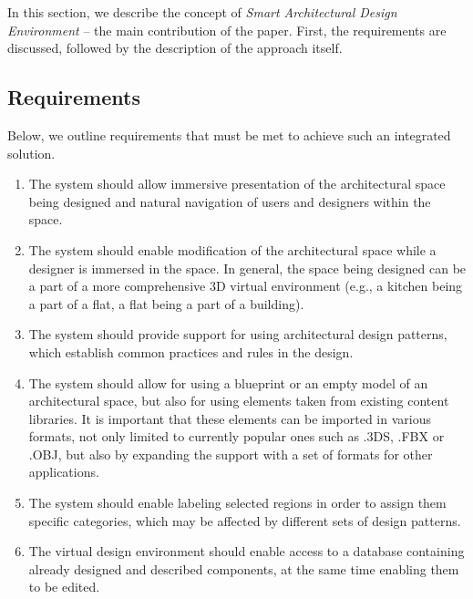 \documentclass[runningheads]{llncs}
\begin{document}
In this section, we describe the concept of \textit{Smart Architectural Design Environment} -- the main contribution of the paper. First, the requirements are discussed, followed by the description of the approach itself.  

\subsection{Requirements}
Below, we outline requirements that must be met to achieve such an integrated solution.

\begin{enumerate}
\item	\label{req-vr} The system should allow immersive presentation of the architectural space being designed and natural navigation of users and designers within the space.\\

\item	\label{req-edit-vr} The system should enable modification of the architectural space while a designer is immersed in the space. In general, the space being designed can be a part of a more comprehensive 3D virtual environment (e.g., a kitchen being a part of a flat, a flat being a part of a building).\\

\item \label{req-patterns} The system should provide support for using architectural design patterns, which establish common practices and rules in the design. \\

\item \label{req-libraries} The system should allow for using a blueprint or an empty model of an architectural space, but also for using elements taken from existing content libraries. It is important that these elements can be imported in various formats, not only limited to currently popular ones such as .3DS, .FBX or .OBJ, but also by expanding the support with a set of formats for other applications.\\

\item	\label{req-labeling} The system should enable labeling selected regions in order to assign them specific categories, which may be affected by different sets of design patterns.\\


\item	\label{req-components} The virtual design environment should enable access to a database containing already designed and described components, at the same time enabling them to be edited.\\


\end{enumerate}
\end{document}

